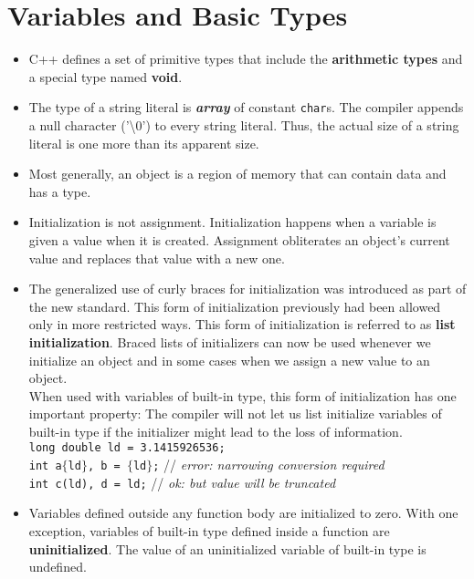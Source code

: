 \section{Variables and Basic Types}
\begin{itemize}

\item C++ defines a set of primitive types that include the \textbf{arithmetic types} and a special type named \textbf{void}.

\item The type of a string literal is \textbf{\textit{array}} of constant \texttt{char}s. The compiler appends a null character ('\textbackslash{}0') to every string literal. Thus, the actual size of a string literal is one more than its apparent size.

\item Most generally, an object is a region of memory that can contain data and has a type.

\item Initialization is not assignment. Initialization happens when a variable is given a value when it is created. Assignment obliterates an object's current value and replaces that value with a new one.

\item The generalized use of curly braces for initialization was introduced as part of the new standard. This form of initialization previously had been allowed only in more restricted ways. This form of initialization is referred to as \textbf{list initialization}. Braced lists of initializers can now be used whenever we initialize an object and in some cases when we assign a new value to an object.\\When used with variables of built-in type, this form of initialization has one important property: The compiler will not let us list initialize variables of built-in type if the initializer might lead to the loss of information.\\\hspace*{1em}\texttt{long double ld = 3.1415926536;}\\\hspace*{1em}\texttt{int a$\{$ld$\}$, b = $\{$ld$\}$;} // \textit{error: narrowing conversion required}\\\hspace*{1em}\texttt{int c(ld), d = ld;} // \textit{ok: but value will be truncated}

\item Variables defined outside any function body are initialized to zero. With one exception, variables of built-in type defined inside a function are \textbf{uninitialized}. The value of an uninitialized variable of built-in type is undefined.


\end{itemize}
